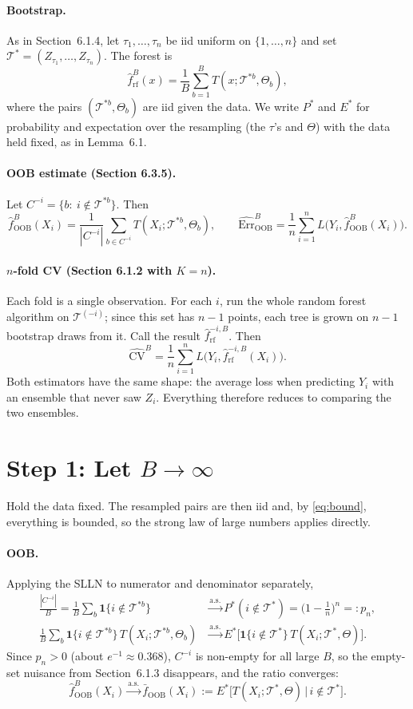 \documentclass[11pt,a4paper]{article}
\theoremstyle{remark}
\newcommand{\cT}{\mathcal T}
\newcommand{\1}{\mathbf 1}
\newcommand{\Err}{\widehat{\mathrm{Err}}}
\newcommand{\CV}{\widehat{\mathrm{CV}}}
\newcommand{\fOOB}{\bar f_{\mathrm{OOB}}}
\begin{document}
\paragraph{Bootstrap.}
As in Section~6.1.4, let $\tau_1,\dots,\tau_n$ be iid uniform on $\{1,\dots,n\}$ and set $\cT^*=(Z_{\tau_1},\dots,Z_{\tau_n})$. The forest is
\[
\hat f^B_{\mathrm{rf}}(x)=\frac1B\sum_{b=1}^B T(x;\cT^{*b},\Theta_b),
\]
where the pairs $(\cT^{*b},\Theta_b)$ are iid given the data. We write $P^*$ and $E^*$ for probability and expectation over the resampling (the $\tau$'s and $\Theta$) with the data held fixed, as in Lemma~6.1.

\paragraph{OOB estimate (Section 6.3.5).}
Let $C^{-i}=\{b:\ i\notin\cT^{*b}\}$. Then
\[
\hat f^B_{\mathrm{OOB}}(X_i)=\frac{1}{|C^{-i}|}\sum_{b\in C^{-i}}T(X_i;\cT^{*b},\Theta_b),
\qquad
\Err^B_{\mathrm{OOB}}=\frac1n\sum_{i=1}^n L\big(Y_i,\hat f^B_{\mathrm{OOB}}(X_i)\big).
\]

\paragraph{$n$-fold CV (Section 6.1.2 with $K=n$).}
Each fold is a single observation. For each $i$, run the whole random forest algorithm on $\cT^{(-i)}$; since this set has $n-1$ points, each tree is grown on $n-1$ bootstrap draws from it. Call the result $\hat f^{-i,B}_{\mathrm{rf}}$. Then
\[
\CV^B=\frac1n\sum_{i=1}^n L\big(Y_i,\hat f^{-i,B}_{\mathrm{rf}}(X_i)\big).
\]
Both estimators have the same shape: the average loss when predicting $Y_i$ with an ensemble that never saw $Z_i$. Everything therefore reduces to comparing the two ensembles.

\section*{Step 1: Let $B\to\infty$}

Hold the data fixed. The resampled pairs are then iid and, by \eqref{eq:bound}, everything is bounded, so the strong law of large numbers applies directly.

\paragraph{OOB.} Applying the SLLN to numerator and denominator separately,
\begin{align*}
\frac{|C^{-i}|}{B}=\frac1B\sum_{b}\1\{i\notin\cT^{*b}\}
&\xrightarrow{\text{a.s.}} P^*(i\notin\cT^*)=\Big(1-\frac1n\Big)^n=:p_n,\\
\frac1B\sum_{b}\1\{i\notin\cT^{*b}\}\,T(X_i;\cT^{*b},\Theta_b)
&\xrightarrow{\text{a.s.}} E^*\big[\1\{i\notin\cT^*\}\,T(X_i;\cT^*,\Theta)\big].
\end{align*}
Since $p_n>0$ (about $e^{-1}\approx0.368$), $C^{-i}$ is non-empty for all large $B$, so the empty-set nuisance from Section~6.1.3 disappears, and the ratio converges:
\[
\hat f^B_{\mathrm{OOB}}(X_i)\xrightarrow{\text{a.s.}}\fOOB(X_i):=E^*\big[T(X_i;\cT^*,\Theta)\,\big|\,i\notin\cT^*\big].
\]
\end{document}
